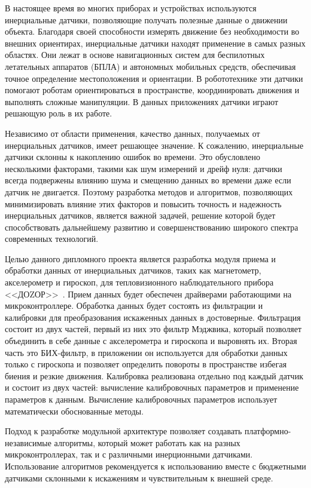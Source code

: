 \label{sec:intro}

В настоящее время во многих приборах и устройствах используются инерциальные датчики, 
позволяющие получать полезные данные о движении объекта.
Благодаря своей способности измерять движение без необходимости во внешних ориентирах, 
инерциальные датчики находят применение в самых разных областях. Они лежат в основе навигационных 
систем для беспилотных летательных аппаратов (БПЛА) и автономных мобильных средств, обеспечивая 
точное определение местоположения и ориентации. В робототехнике эти датчики помогают роботам 
ориентироваться в пространстве, координировать движения и выполнять сложные манипуляции.
В данных приложениях датчики играют решающую роль в их работе.

Независимо от области применения, качество данных, получаемых от инерциальных датчиков, имеет решающее значение.
К сожалению, инерциальные датчики склонны к накоплению ошибок во времени. Это обусловлено несколькими факторами, 
такими как шум измерений и дрейф нуля: датчики всегда подвержены влиянию шума и смещению данных во времени даже если датчик не двигается.
Поэтому разработка методов и алгоритмов, позволяющих минимизировать влияние этих факторов и повысить точность и надежность инерциальных датчиков,
является важной задачей, решение которой будет способствовать дальнейшему развитию и совершенствованию широкого спектра современных технологий.

Целью данного дипломного проекта является разработка модуля приема и обработки данных от инерциальных датчиков,
таких как магнетометр, акселерометр и гироскоп, для тепловизионного наблюдательного прибора <<ДОZОР>>~.
Прием данных будет обеспечен драйверами работающими на микроконтроллере.
Обработка данных будет состоять из фильтрации и калибровки для преобразования искаженных данных в достоверные. 
Фильтрация состоит из двух частей, первый из них это фильтр Мэджвика, который позволяет объединить в себе данные с 
акселерометра и гироскопа и выровнять их. Вторая часть это БИХ-фильтр, в приложении он используется для обработки данных только с гироскопа
и позволяет определить повороты в пространстве избегая биения и резкие движения. 
Калибровка реализована отдельно под каждый датчик и состоит из двух частей: вычисление калибровочных параметров и применение параметров к данным.
Вычисление калибровочных параметров использует математически обоснованные методы. 

Подход к разработке модульной архитектуре позволяет создавать платформно-независимые алгоритмы, который может работать как на разных 
микроконтроллерах, так и с различными инерционными датчиками. Использование алгоритмов рекомендуется к использованию вместе с 
бюджетными датчиками склонными к искажениям и чувствительным к
внешней среде. 

